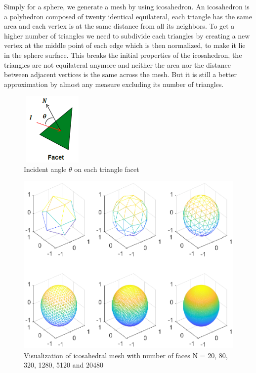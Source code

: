 \documentclass[11pt]{amsart}
\theoremstyle{definition}
\begin{document}
Simply for a sphere, we generate a mesh by using icosahedron. An icosahedron is a polyhedron composed of twenty identical equilateral, each triangle has the same area and each vertex is at the same distance from all its neighbors. To get a higher number of triangles we need to subdivide each triangles by creating a new vertex at the middle point of each edge which is then normalized, to make it lie in the sphere surface. This breaks the initial properties of the icosahedron, the triangles are not equilateral anymore and neither the area nor the distance between adjacent vertices is the same across the mesh. But it is still a better approximation by almost any measure excluding its number of triangles. 

\begin{figure}[H]  	\centerline{\includegraphics[height=1.4in,width=1.2in]{./figs/facet.png}}
		\caption{Incident angle $\theta$ on each triangle facet}
        \label{fig:facet}
\end{figure}

\begin{figure}[H] 	\centerline{\includegraphics[width=4.8in]{./figs/icosahedron.eps}}
		\caption{Visualization of icosahedral mesh with number of faces N = 20, 80, 320, 1280, 5120 and 20480}
        \label{fig:icosahedron}
\end{figure}
\end{document}
